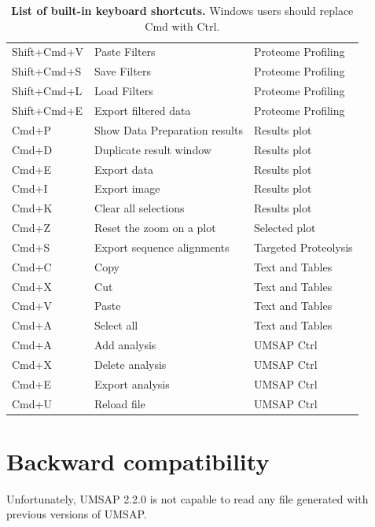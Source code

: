 \begin{table}[h!]
\begin{tabular}{l l l}
        Shift+Cmd+V&Paste Filters                      &Proteome Profiling\\
        Shift+Cmd+S&Save Filters                       &Proteome Profiling\\
        Shift+Cmd+L&Load Filters                       &Proteome Profiling\\
        Shift+Cmd+E&Export filtered data               &Proteome Profiling\\
        Cmd+P      &Show Data Preparation results      &Results plot\\
        Cmd+D      &Duplicate result window            &Results plot\\
        Cmd+E      &Export data                        &Results plot\\
        Cmd+I      &Export image                       &Results plot\\
        Cmd+K      &Clear all selections               &Results plot\\
        Cmd+Z      &Reset the zoom       on a plot     &Selected plot\\
        Cmd+S      &Export sequence alignments         &Targeted Proteolysis\\
        Cmd+C      &Copy                               &Text and Tables\\
        Cmd+X      &Cut                                &Text and Tables\\
        Cmd+V      &Paste                              &Text and Tables\\
        Cmd+A      &Select all                         &Text and Tables\\
        Cmd+A      &Add analysis                       &UMSAP Ctrl\\
        Cmd+X      &Delete analysis                    &UMSAP Ctrl\\
        Cmd+E      &Export analysis                    &UMSAP Ctrl\\
        Cmd+U      &Reload file                        &UMSAP Ctrl\\
        \hline		
    \end{tabular}
    \caption[List of built-in keyboard shortcuts]{\textbf{List of built-in keyboard
    shortcuts.} Windows users should replace Cmd with Ctrl.}
    \label{table:shortcuts}
\end{table}

\section{Backward compatibility}
\label{sec:backwardCompatibility}

Unfortunately, UMSAP 2.2.0 is not capable to read any file generated with previous
versions of UMSAP.
